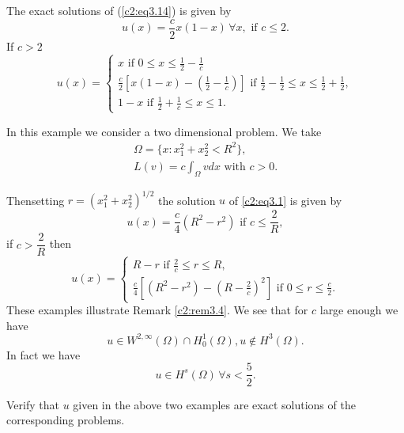 The exact solutions of (\ref{c2:eq3.14}) is given by
\begin{equation}
 u (x) = \frac{c}{2} x(1 - x)\, \forall  x, \text{ if } c \leq
 2. \tag{3.15}\label{c2:eq3.15} 
 \end{equation}
 If $c > 2$
 \begin{equation}
u(x)=
\begin{cases}
x \text{ if } 0 \leq x \leq \frac{1}{2} - \frac{1} {c}\\
\frac{c}{2} [x(1 - x) - (\frac{1}{2} - \frac{1}{c})] \text{ if }
\frac{1}{2} - \frac{1}{2} \leq x \leq \frac{1}{2} + \frac{1}{2},\\ 
1 - x \text{ if } \frac{1} {2} + \frac{1}{c} \leq x \leq 1.
\tag{3.16}\label{c2:eq3.16} 
\end{cases}
 \end{equation} 
 
\begin{example}%
In this example we consider a two dimensional problem. We take 
\begin{gather*}
\Omega = \{x : x^2_1 + x^2_2 < R^2 \},\\
L(v) = c \int_\Omega v dx \text{ with } c > 0.
\end{gather*}
\end{example} 
 
 Then\pageoriginale  setting $r = (x^2_1 + x^2_2)^{1/2}$ the solution $u$ of \eqref{c2:eq3.1} is  given by  
 \begin{equation}
 u (x) = \frac{c}{4} (R^2 - r^2) \text{ if } c \leq
 \frac{2}{R},\tag{3.17}\label{c2:eq3.17} 
 \end{equation}
 if $c > \dfrac{2}{R}$ then 
 \begin{equation}
u(x)=
\begin{cases}
R - r \text{ if }\frac{2}{c} \leq r \leq R,\\
\frac{c}{4} [(R^2 - r^2) - (R - \frac{2}{c})^2 ] \text{ if } 0 \leq r
\leq \frac{c}{2}.\tag{3.18}\label{c2:eq3.18} 
\end{cases}
 \end{equation} 
 These examples illustrate Remark \ref{c2:rem3.4}. We see that for $c$ large
 enough we have  
 \begin{equation}
u \in W^{2, \infty} (\Omega) \cap H^1_0 (\Omega), u \notin H^3
(\Omega). \tag{3.19}\label{c2:eq3.19} 
 \end{equation} 
 In fact we have 
 $$
 u \in H^s (\Omega)\, \forall  s < \frac{5}{2}.
 $$
 \begin{exercise}%
Verify that $u$ given in the above two examples are exact solutions of
the corresponding problems. 
 \end{exercise} 
 
